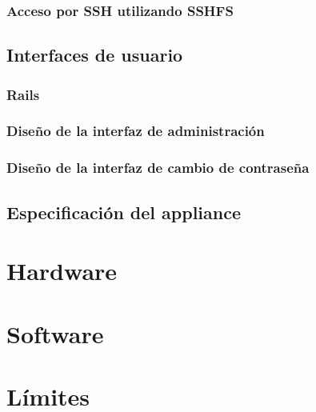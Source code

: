        \subsubsection {Acceso por SSH utilizando SSHFS}
      \subsection {Interfaces de usuario}
        \subsubsection {Rails}
        \subsubsection {Dise\~{n}o de la interfaz de administraci\'{o}n}
        \subsubsection {Dise\~{n}o de la interfaz de cambio de contrase\~{n}a}
    \subsection {Especificaci\'{o}n del appliance}
      \section {Hardware}
      \section {Software}
      \section {L\'{i}mites}
